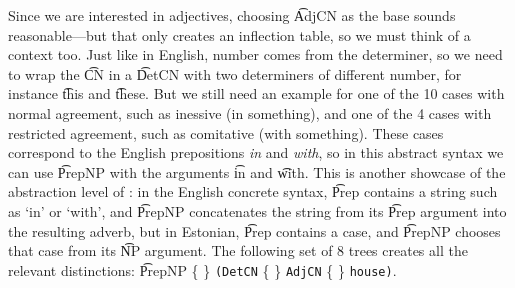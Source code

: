 \noindent Since we are interested in adjectives, choosing \t{AdjCN} as
the base sounds reasonable---but that only creates an inflection
table, so we must think of a context too. Just like in English, number
comes from the determiner, so we need to wrap the \t{CN} in a \t{DetCN}
with two determiners of different number, for instance \t{this} and
\t{these}. But we still need an example for one of the 10 cases with
normal agreement, such as inessive (in something), and one of the 4
cases with restricted agreement, such as comitative (with something).
These cases correspond to the English prepositions \emph{in} and \emph{with},
so in this abstract syntax we can use \t{PrepNP} with the arguments
\t{in} and \t{with}. This is another showcase of the abstraction level
of \gf{}: in the English concrete syntax, \t{Prep} contains a string
such as `in' or `with', and \t{PrepNP} concatenates the string from its
\t{Prep} argument into the resulting adverb, but in Estonian, \t{Prep}
contains a case, and \t{PrepNP} chooses that case from its \t{NP} argument.
The following set of 8 trees creates all the relevant
distinctions:
 \t{PrepNP} \{  \}
             {\tt (DetCN} \{  \} 
             {\tt AdjCN}  \{ \} 
             {\tt house)}.


